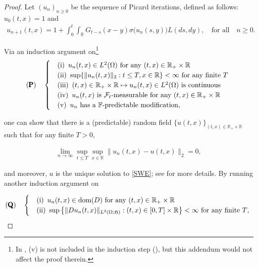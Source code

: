 \documentclass[letterpaper, 11pt,  reqno]{amsart}
\newcommand{\noi}{\noindent}
\newcommand{\R}{\mathbb{R}}
\newcommand{\s}{\sigma}
\renewcommand{\O}{\Omega}
\newcommand{\N}{\mathbb{N}}
\newcommand{\fH}{\mathfrak{H}}
\newcommand{\dom}{\textup{dom}}
\numberwithin{equation}{section}
\numberwithin{theorem}{section}
\begin{document}
\begin{proof}%

Let  $(u_n)_{n\geq 0}$ be the sequence of Picard iterations, defined as follows:
$u_0(t,x) =1$ and 
\noi
\begin{align}
\label{nPicard}
u_{n+1}(t,x) = 1 + \int_0^t\int_\R G_{t-s}(x-y) \s\big( u_{n}(s, y) \big) L(ds, dy), 
\quad \mbox{for all} \quad n \geq 0. %
\end{align}


\noi
Via an induction argument on\footnote{In \cite[Theorem 9]{BN17}, (v) is not included in the induction 
step (), but this addendum would not affect the proof therein.  }
\begin{align}\label{propP}
\textup{(\pmb{P})}
\quad
\begin{cases}
&{\rm(i)} \,\,\, \text{$u_n(t,x)\in  L^2(\O)$   for any $(t,x)\in\R_+\times\R$} \\
&{\rm(ii)} \,\,\, \text{$\sup\{ \| u_n(t,x)\|_2 : t\leq T, x\in\R\} <\infty$ for any finite $T$    } \\
&{\rm(iii)} \,\,\, \text{$(t,x)\in\R_+\times\R\mapsto u_n(t,x)\in L^2(\O)$ is continuous} \\
&{\rm(iv)} \,\,\, \text{$u_n(t,x)$ is $\mathcal{F}_t$-measurable for any $(t,x)\in\R_+\times\R$ } \\
&{\rm(v)} \,\,\, \text{$u_n$ has a $\mathbb{F}$-predictable modification, } 
\end{cases}
\end{align}

\noi
one can   show that there is a (predictable) random field $\{u(t,x)\}_{(t, x)\in\R_+\times\R}$ such that 
for any finite $T>0$,

\noi
\begin{align}\label{unic3}
\lim_{n\to\infty} \sup_{t\leq T} \sup_{x\in\R} \| u_n(t,x) - u(t,x) \|_2  = 0,
\end{align}

\noi
and moreover, $u$ is the unique solution to \eqref{SWE};
see \cite[Theorem 9]{BN17} for more details. 
By running another induction argument on %



\noi
\begin{align}\label{propQ}
\textup{(\pmb{Q})}
\quad
\begin{cases}
&{\rm(i)} \,\,\, \text{$u_n(t,x)\in  \dom(D)$   for any $(t,x)\in\R_+\times\R$} \\
&{\rm(ii)} \,\,\, \text{$\displaystyle 
\sup\big\{ \| Du_n(t,x)\|_{L^2(\O;\fH)} : (t, x)\in[0,T]\times\R\big\}  <\infty$
 for any finite $T$,    } %
\end{cases}
\end{align}
 

\end{proof}
\end{document}
